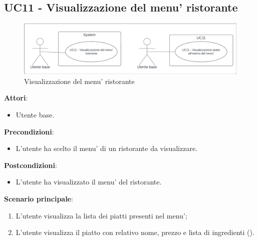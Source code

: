 \subsection{UC11 - Visualizzazione del menu' ristorante} \label{usecase:11}
\begin{figure}[H]
    \centering
    \includegraphics[width=0.9\linewidth]{ucd/ucd11.png}
\caption{Visualizzazione del menu' ristorante}
\end{figure}
\textbf{Attori}:
\begin{itemize}
    \item Utente base.
\end{itemize}
\textbf{Precondizioni}:
\begin{itemize}
    \item L'utente ha scelto il menu' di un ristorante da visualizzare.
\end{itemize}
\textbf{Postcondizioni}:
\begin{itemize}
    \item L'utente ha visualizzato il menu' del ristorante.
\end{itemize}
\textbf{Scenario principale}:
\begin{enumerate}
    \item L'utente visualizza la lista dei piatti presenti nel menu';
    \item L’utente visualizza il piatto con relativo nome, prezzo e lista di ingredienti ().
\end{enumerate}

